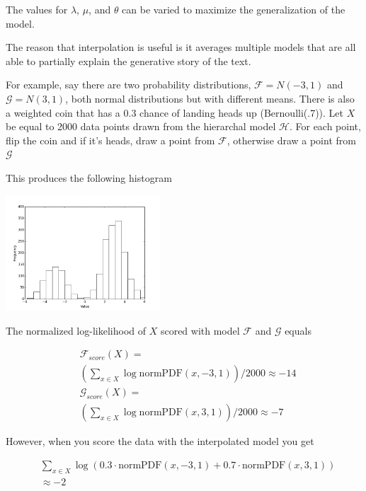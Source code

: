 \documentclass[11pt]{article}
\begin{document}
The values for $\lambda$, $\mu$, and $\theta$ can be varied to maximize the generalization of the model.

The reason that interpolation is useful is it averages multiple models that are all able to partially explain the generative story of the text.

For example, say there are two probability distributions, $\mathcal{F} = N\left(-3, 1\right)$ and $\mathcal{G} = N\left(3, 1 \right)$, both normal distributions but with different means. There is also a weighted coin that has a $0.3$ chance of landing heads up (Bernoulli(.7)). Let $X$ be equal to 2000 data points drawn from the hierarchal model $\mathcal{H}$. For each point, flip the coin and if it's heads, draw a point from $\mathcal{F}$, otherwise draw a point from $\mathcal{G}$

This produces the following histogram

\includegraphics[width=218px]{graphs/hist.png}

The normalized log-likelihood of $X$ scored with model $\mathcal{F}$ and $\mathcal{G}$ equals

\begin{align*}
&\mathcal{F}_{score}\left(X\right) = \\
& \left(\sum\limits_{x \in X} \log \text{normPDF}\left(x, -3, 1\right)\right) / 2000 \approx -14 \\
&\mathcal{G}_{score}\left(X\right) = \\
&\left(\sum\limits_{x \in X} \log \text{normPDF}\left(x, 3, 1\right)\right) / 2000 \approx -7
\end{align*}

However, when you score the data with the interpolated model you get

\begin{align*}
&\sum\limits_{x \in X} \log \left( 0.3 \cdot \text{normPDF}\left(x, -3, 1\right) + 0.7 \cdot \text{normPDF}\left(x, 3, 1\right) \right) \\
&\approx -2
\end{align*}
\end{document}
